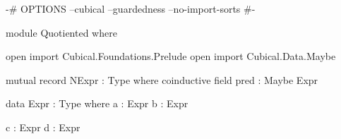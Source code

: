 \begin{code}[hide]
{-# OPTIONS --cubical --guardedness --no-import-sorts #-}

module Quotiented where

open import Cubical.Foundations.Prelude
open import Cubical.Data.Maybe
\end{code}

\begin{code}
mutual
  record NExpr : Type where
    coinductive
    field
      pred : Maybe Expr

  data Expr : Type where
    a : Expr
    b : Expr
\end{code}

\begin{code}
    c : Expr
    d : Expr
\end{code}
